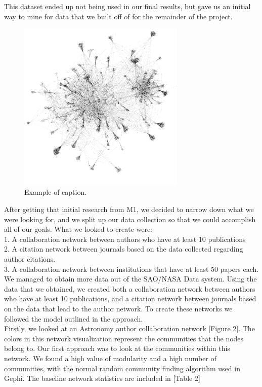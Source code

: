 \documentclass[times, 10pt,twocolumn]{article}
\begin{document}
This dataset ended up not being used in our final results, but gave us an initial way to mine for data that we built off of for the remainder of the project.

\begin{figure}[h]
   \includegraphics[width=8cm]{figure1.png}
   \caption{Example of caption.}
\end{figure}

After getting that initial research from M1, we decided to narrow down what we were looking for, and we split up our data collection so that we could accomplish all of our goals. What we looked to create were: \\
1. A collaboration network between authors who have at least 10 publications \\
2. A citation network between journals based on the data collected regarding author citations.\\
3. A collaboration network between institutions that have at least 50 papers each.\\

We managed to obtain more data out of the SAO/NASA Data system. Using the data that we obtained, we created both a collaboration network between authors who have at least 10 publications, and a citation network between journals based on the data that lead to the author network. To create these networks we followed the model outlined in the approach.  \\

Firstly, we looked at an Astronomy author collaboration network [Figure 2]. The colors in this network visualization represent the communities that the nodes belong to. Our first approach was to look at the communities within this network. We found a high value of modularity and a high number of communities, with the normal random community finding algorithm used in Gephi. The baseline network statistics are included in [Table 2] \\
\end{document}
